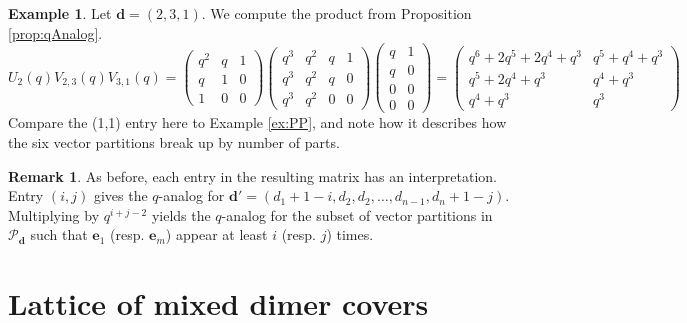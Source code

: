 \documentclass{amsart}
\def\bfd{{\mathbf{d}}}
\theoremstyle{definition}
\newtheorem{example}[theorem]{Example}
\newtheorem{remark}[theorem]{Remark}
\begin{document}
\begin{example}\label{ex:qMatrixProductEnumeration}
Let $\mathbf{d} = (2,3,1)$. We compute the product from Proposition \ref{prop:qAnalog}. \[
U_{2}(q)V_{2,3}(q) V_{3,1}(q) =
\begin{pmatrix}
    q^2 & q & 1 \\
    q & 1& 0\\
    1 & 0 & 0
\end{pmatrix}
\begin{pmatrix}
    q^3 & q^2 & q & 1 \\
    q^3 & q^2 & q & 0 \\
    q^3 & q^2 & 0 & 0
\end{pmatrix}
\begin{pmatrix}
    q & 1 \\
    q & 0 \\
    0 & 0 \\
    0 & 0
\end{pmatrix} =
\begin{pmatrix}
    q^6 + 2q^5 + 2q^4 + q^3 & q^5+q^4+q^3\\
    q^5+2q^4+q^3& q^4+q^3 \\
    q^4+q^3 & q^3
\end{pmatrix}
    \]
Compare the (1,1) entry here to Example \ref{ex:PP}, and note how it describes how the six vector partitions break up by number of parts.
\end{example}

\begin{remark}
    As before, each entry in the resulting matrix
    has an interpretation. Entry $(i,j)$ gives the
    $q$-analog for $\bfd'=(d_1+1-i,d_2,d_2,\ldots,d_{n-1},d_n+1-j)$. Multiplying by $q^{i+j-2}$ yields the $q$-analog for the subset
    of vector partitions in $\mathcal{P}_\bfd$ such that
    $\mathbf{e}_1$ (resp. $\mathbf{e}_m$) appear at least $i$ (resp. $j$) times.
\end{remark}

\section{Lattice of mixed dimer covers}\label{sec:md}
\end{document}
